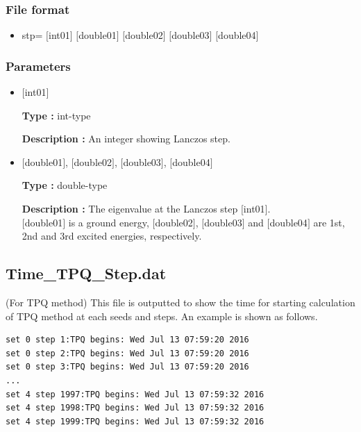 \subsubsection{File format}
 \begin{itemize}
   \item stp= $[$int01$]$ $[$double01$]$ $[$double02$]$ $[$double03$]$ $[$double04$]$
  \end{itemize}
\subsubsection{Parameters}
 \begin{itemize}

  \item  $[$int01$]$
  
 {\bf Type :} int-type

{\bf Description :} An integer showing Lanczos step.
 
  \item  $[$double01$]$, $[$double02$]$, $[$double03$]$, $[$double04$]$

 {\bf Type :} double-type 

{\bf Description :} The eigenvalue at the Lanczos step $[$int01$]$.\\
$[$double01$]$ is a ground energy, $[$double02$]$, $[$double03$]$ and $[$double04$]$ are 1st, 2nd and 3rd excited energies, respectively.

 \end{itemize}

\newpage
\subsection{Time\_TPQ\_Step.dat}
(For TPQ method) This file is outputted to show the time for starting calculation of TPQ method at each seeds and steps. An example is shown as follows.\\
\begin{minipage}{15cm}
\begin{screen}
\begin{verbatim}
set 0 step 1:TPQ begins: Wed Jul 13 07:59:20 2016
set 0 step 2:TPQ begins: Wed Jul 13 07:59:20 2016
set 0 step 3:TPQ begins: Wed Jul 13 07:59:20 2016
...
set 4 step 1997:TPQ begins: Wed Jul 13 07:59:32 2016
set 4 step 1998:TPQ begins: Wed Jul 13 07:59:32 2016
set 4 step 1999:TPQ begins: Wed Jul 13 07:59:32 2016
\end{verbatim}
\end{screen}
\end{minipage}

